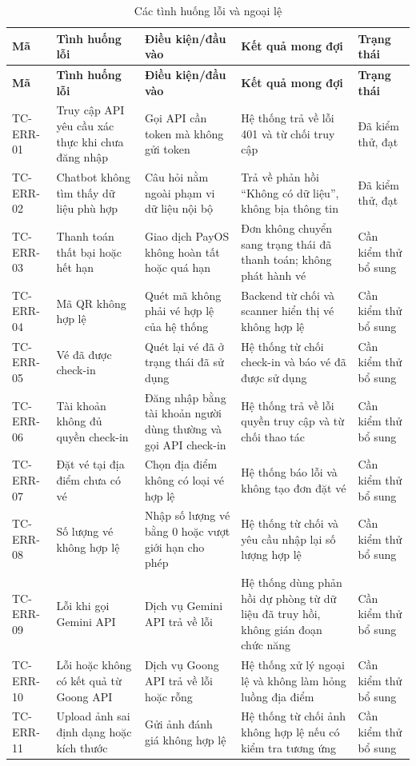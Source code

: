 ﻿\documentclass[../DoAn.tex]{subfiles}
\begin{document}
\begin{landscape}
\scriptsize
\setlength{\LTleft}{0pt}\setlength{\LTright}{0pt}\setlength{\tabcolsep}{3pt}\renewcommand{\arraystretch}{1.15}
\begin{longtable}{|L{1.5cm}|L{4.0cm}|L{5.0cm}|L{5.6cm}|L{2.6cm}|}
\caption{Các tình huống lỗi và ngoại lệ}
\label{tab:test-error}\\
\hline
\textbf{Mã} & \textbf{Tình huống lỗi} & \textbf{Điều kiện/đầu vào} & \textbf{Kết quả mong đợi} & \textbf{Trạng thái} \\
\hline
\endfirsthead
\hline
\textbf{Mã} & \textbf{Tình huống lỗi} & \textbf{Điều kiện/đầu vào} & \textbf{Kết quả mong đợi} & \textbf{Trạng thái} \\
\hline
\endhead
TC-ERR-01 & Truy cập API yêu cầu xác thực khi chưa đăng nhập & Gọi API cần token mà không gửi token & Hệ thống trả về lỗi 401 và từ chối truy cập & Đã kiểm thử, đạt \\
\hline
TC-ERR-02 & Chatbot không tìm thấy dữ liệu phù hợp & Câu hỏi nằm ngoài phạm vi dữ liệu nội bộ & Trả về phản hồi ``Không có dữ liệu'', không bịa thông tin & Đã kiểm thử, đạt \\
\hline
TC-ERR-03 & Thanh toán thất bại hoặc hết hạn & Giao dịch PayOS không hoàn tất hoặc quá hạn & Đơn không chuyển sang trạng thái đã thanh toán; không phát hành vé & Cần kiểm thử bổ sung \\
\hline
TC-ERR-04 & Mã QR không hợp lệ & Quét mã không phải vé hợp lệ của hệ thống & Backend từ chối và scanner hiển thị vé không hợp lệ & Cần kiểm thử bổ sung \\
\hline
TC-ERR-05 & Vé đã được check-in & Quét lại vé đã ở trạng thái đã sử dụng & Hệ thống từ chối check-in và báo vé đã được sử dụng & Cần kiểm thử bổ sung \\
\hline
TC-ERR-06 & Tài khoản không đủ quyền check-in & Đăng nhập bằng tài khoản người dùng thường và gọi API check-in & Hệ thống trả về lỗi quyền truy cập và từ chối thao tác & Cần kiểm thử bổ sung \\
\hline
TC-ERR-07 & Đặt vé tại địa điểm chưa có vé & Chọn địa điểm không có loại vé hợp lệ & Hệ thống báo lỗi và không tạo đơn đặt vé & Cần kiểm thử bổ sung \\
\hline
TC-ERR-08 & Số lượng vé không hợp lệ & Nhập số lượng vé bằng 0 hoặc vượt giới hạn cho phép & Hệ thống từ chối và yêu cầu nhập lại số lượng hợp lệ & Cần kiểm thử bổ sung \\
\hline
TC-ERR-09 & Lỗi khi gọi Gemini API & Dịch vụ Gemini API trả về lỗi & Hệ thống dùng phản hồi dự phòng từ dữ liệu đã truy hồi, không gián đoạn chức năng & Cần kiểm thử bổ sung \\
\hline
TC-ERR-10 & Lỗi hoặc không có kết quả từ Goong API & Dịch vụ Goong API trả về lỗi hoặc rỗng & Hệ thống xử lý ngoại lệ và không làm hỏng luồng địa điểm & Cần kiểm thử bổ sung \\
\hline
TC-ERR-11 & Upload ảnh sai định dạng hoặc kích thước & Gửi ảnh đánh giá không hợp lệ & Hệ thống từ chối ảnh không hợp lệ nếu có kiểm tra tương ứng & Cần kiểm thử bổ sung \\
\hline
\end{longtable}
\end{landscape}
\end{document}
